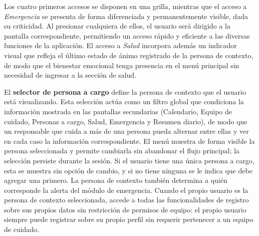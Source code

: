 \documentclass[a4paper,12pt]{article}
\begin{document}
    \par Los cuatro primeros accesos se disponen en una grilla, mientras que el acceso a \textit{Emergencia} se presenta de forma diferenciada y permanentemente visible, dada su criticidad. Al presionar cualquiera de ellos, el usuario será dirigido a la pantalla correspondiente, permitiendo un acceso rápido y eficiente a las diversas funciones de la aplicación. El acceso a \textit{Salud} incorpora además un indicador visual que refleja el último estado de ánimo registrado de la persona de contexto, de modo que el bienestar emocional tenga presencia en el menú principal sin necesidad de ingresar a la sección de salud.
    \par El \textbf{selector de persona a cargo} define la persona de contexto que el usuario está visualizando. Esta selección actúa como un filtro global que condiciona la información mostrada en las pantallas secundarias (Calendario, Equipo de cuidado, Personas a cargo, Salud, Emergencia y Resumen diario), de modo que un responsable que cuida a más de una persona pueda alternar entre ellas y ver en cada caso la información correspondiente. El menú muestra de forma visible la persona seleccionada y permite cambiarla sin abandonar el flujo principal; la selección persiste durante la sesión. Si el usuario tiene una única persona a cargo, esta se muestra sin opción de cambio, y si no tiene ninguna se le indica que debe agregar una primero. La persona de contexto también determina a quién corresponde la alerta del módulo de emergencia. Cuando el propio usuario es la persona de contexto seleccionada, accede a todas las funcionalidades de registro sobre sus propios datos sin restricción de permisos de equipo: el propio usuario siempre puede registrar sobre su propio perfil sin requerir pertenecer a un equipo de cuidado.
\end{document}
